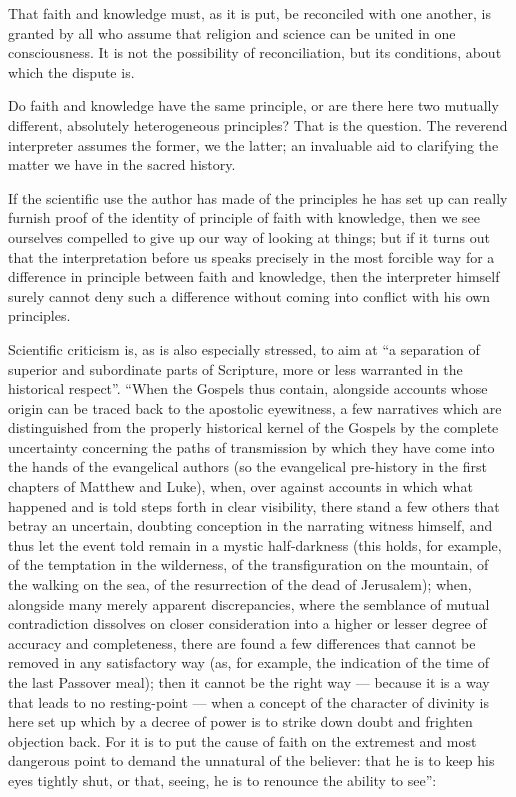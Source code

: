 \documentclass[12pt,a4paper,openany]{book}
\newcommand{\opage}[1]{\marginnote{\footnotesize\textit{[#1]}}}
\begin{document}
That faith and knowledge must, as it is put, be reconciled
with one another, is granted by all who assume that religion
and science can be united in one consciousness.
It is not the possibility of reconciliation, but its conditions,
about which the dispute is.

Do faith and knowledge have the same principle, or are there here two
mutually different, absolutely heterogeneous principles? That
is the question. The reverend interpreter assumes
the former, we the latter; an invaluable aid
to clarifying the matter we have in the sacred history.

If the scientific use the author has
made of the principles he has set up can really furnish
proof of the identity of principle of faith with knowledge, then we see
\setcounter{footnote}{0}%
\opage{295}ourselves compelled to give up our way of looking at things; but if it turns
out that the interpretation before us speaks precisely in the
most forcible way for a difference in principle between faith
and knowledge, then the interpreter himself surely cannot deny
such a difference without coming into conflict with his
own principles.

Scientific criticism is, as is also especially
stressed, to aim at ``a separation of superior
and subordinate parts of Scripture, more or less
warranted in the historical respect''. ``When the Gospels thus
contain, alongside accounts whose origin
can be traced back to the apostolic eyewitness, a few
narratives which are distinguished from the properly historical
kernel of the Gospels by the complete uncertainty concerning
the paths of transmission by which they have come
into the hands of the evangelical authors (so the evangelical
pre-history in the first chapters of Matthew
and Luke), when, over against accounts in which what happened
and is told steps forth in clear visibility,
there stand a few others that betray an uncertain, doubting conception
in the narrating witness himself, and thus let
the event told remain in a mystic half-darkness
(this holds, for example, of the temptation in the wilderness, of the transfiguration
on the mountain, of the walking on the sea, of
the resurrection of the dead of Jerusalem); when, alongside
many merely apparent discrepancies, where
the semblance of mutual contradiction dissolves on closer
consideration into a higher or lesser degree of accuracy
and completeness, there are found a few differences
that cannot be removed in any satisfactory
way (as, for example, the indication of the time of the last
\setcounter{footnote}{0}%
\opage{296}Passover meal); then it cannot be the right way --- because
it is a way that leads to no resting-point ---
when a concept of the character of divinity is here set up
which by a decree of power is to strike down doubt and
frighten objection back. For it is to put
the cause of faith on the extremest and most dangerous point to
demand the unnatural of the believer: that he is to keep
his eyes tightly shut, or that, seeing, he is to renounce
the ability to see'':
\end{document}
